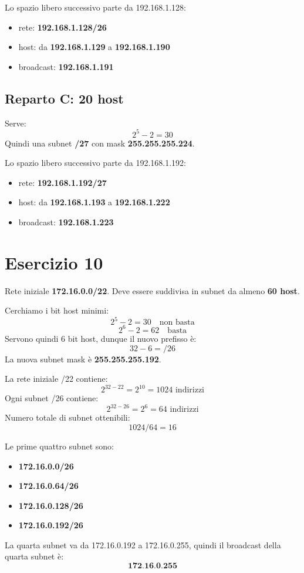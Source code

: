\documentclass[a4paper,12pt]{article}
\begin{document}
Lo spazio libero successivo parte da 192.168.1.128:
\begin{itemize}
    \item rete: \textbf{192.168.1.128/26}
    \item host: da \textbf{192.168.1.129} a \textbf{192.168.1.190}
    \item broadcast: \textbf{192.168.1.191}
\end{itemize}

\subsection*{Reparto C: 20 host}
Serve:
\[
2^5 - 2 = 30
\]
Quindi una subnet \textbf{/27} con mask \textbf{255.255.255.224}.

Lo spazio libero successivo parte da 192.168.1.192:
\begin{itemize}
    \item rete: \textbf{192.168.1.192/27}
    \item host: da \textbf{192.168.1.193} a \textbf{192.168.1.222}
    \item broadcast: \textbf{192.168.1.223}
\end{itemize}

\section*{Esercizio 10}
Rete iniziale \textbf{172.16.0.0/22}. Deve essere suddivisa in subnet da almeno \textbf{60 host}.

Cerchiamo i bit host minimi:
\[
2^5 - 2 = 30 \quad \text{non basta}
\]
\[
2^6 - 2 = 62 \quad \text{basta}
\]
Servono quindi 6 bit host, dunque il nuovo prefisso è:
\[
32 - 6 = /26
\]
La nuova subnet mask è \textbf{255.255.255.192}.

La rete iniziale /22 contiene:
\[
2^{32-22} = 2^{10} = 1024 \text{ indirizzi}
\]
Ogni subnet /26 contiene:
\[
2^{32-26} = 2^6 = 64 \text{ indirizzi}
\]
Numero totale di subnet ottenibili:
\[
1024 / 64 = 16
\]

Le prime quattro subnet sono:
\begin{itemize}
    \item \textbf{172.16.0.0/26}
    \item \textbf{172.16.0.64/26}
    \item \textbf{172.16.0.128/26}
    \item \textbf{172.16.0.192/26}
\end{itemize}

La quarta subnet va da 172.16.0.192 a 172.16.0.255, quindi il broadcast della quarta subnet è:
\[
\textbf{172.16.0.255}
\]
\end{document}
